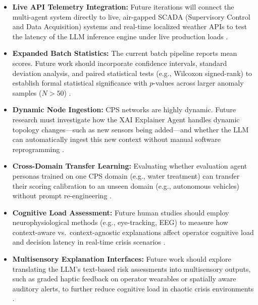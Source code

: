 \documentclass[a4paper,fleqn]{cas-dc}
\begin{document}
\begin{itemize}
    \item \textbf{Live API Telemetry Integration:} Future iterations will connect the multi-agent system directly to live, air-gapped SCADA (Supervisory Control and Data Acquisition) systems and real-time localized weather APIs to test the latency of the LLM inference engine under live production loads \cite{ref3, ref11}.
    \item \textbf{Expanded Batch Statistics:} The current batch pipeline reports mean scores. Future work should incorporate confidence intervals, standard deviation analysis, and paired statistical tests (e.g., Wilcoxon signed-rank) to establish formal statistical significance with $p$-values across larger anomaly samples ($N > 50$) \cite{ref_batch_eval}.
    \item \textbf{Dynamic Node Ingestion:} CPS networks are highly dynamic. Future research must investigate how the XAI Explainer Agent handles dynamic topology changes---such as new sensors being added---and whether the LLM can automatically ingest this new context without manual software reprogramming \cite{ref29}.
    \item \textbf{Cross-Domain Transfer Learning:} Evaluating whether evaluation agent personas trained on one CPS domain (e.g., water treatment) can transfer their scoring calibration to an unseen domain (e.g., autonomous vehicles) without prompt re-engineering \cite{ref_llm_judge}.
    \item \textbf{Cognitive Load Assessment:} Future human studies should employ neurophysiological methods (e.g., eye-tracking, EEG) to measure how context-aware vs.\ context-agnostic explanations affect operator cognitive load and decision latency in real-time crisis scenarios \cite{ref_cognitive_bias, ref77}.
    \item \textbf{Multisensory Explanation Interfaces:} Future work should explore translating the LLM's text-based risk assessments into multisensory outputs, such as graded haptic feedback on operator wearables or spatially aware auditory alerts, to further reduce cognitive load in chaotic crisis environments \cite{ref15}.
\end{itemize}
\end{document}
